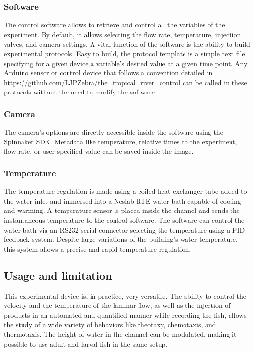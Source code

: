   \subsubsection{Software}
  The control software allows to retrieve and control all the variables of the experiment. By default, it allows selecting the flow rate, temperature, injection valves, and camera settings. A vital function of the software is the ability to build experimental protocols. Easy to build, the protocol template is a simple text file specifying for a given device a variable's desired value at a given time point. Any Arduino sensor or control device that follows a convention detailed in \url{https://github.com/LJPZebra/the_tropical_river_control} can be called in these protocols without the need to modify the software.

  \subsubsection{Camera}
  The camera's options are directly accessible inside the software using the Spinnaker SDK. Metadata like temperature, relative times to the experiment, flow rate, or user-specified value can be saved inside the image.

  \subsubsection{Temperature}
  The temperature regulation is made using a coiled heat exchanger tube added to the water inlet and immersed into a Neslab RTE water bath capable of cooling and warming. A temperature sensor is placed inside the channel and sends the instantaneous temperature to the control software. The software can control the water bath via an RS232 serial connector selecting the temperature using a PID feedback system. Despite large variations of the building's water temperature, this system allows a precise and rapid temperature regulation.

  \subsection{Usage and limitation}
  This experimental device is, in practice, very versatile. The ability to control the velocity and the temperature of the laminar flow, as well as the injection of products in an automated and quantified manner while recording the fish, allows the study of a wide variety of behaviors like rheotaxy, chemotaxis, and thermotaxis. The height of water in the channel can be modulated, making it possible to use adult and larval fish in the same setup.

